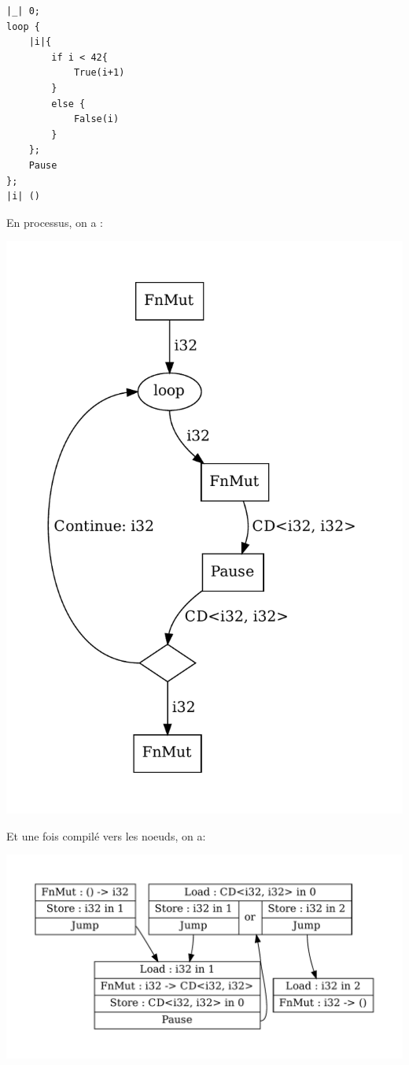 \documentclass[a4paper]{article}
\renewcommand{\(}{\left(}
\renewcommand{\)}{\right)}
\begin{document}
\begin{verbatim}
|_| 0;
loop {
    |i|{
        if i < 42{
            True(i+1)
        }
        else {
            False(i)
        }
    };
    Pause
};
|i| ()
\end{verbatim}
\pagebreak
En processus, on a :
\begin{center}
\includegraphics[scale=0.72]{loopp.pdf}
\end{center}

Et une fois compilé vers les noeuds, on a:
\begin{center}
\includegraphics[scale=0.72]{loopn.pdf}
\end{center}
\end{document}
